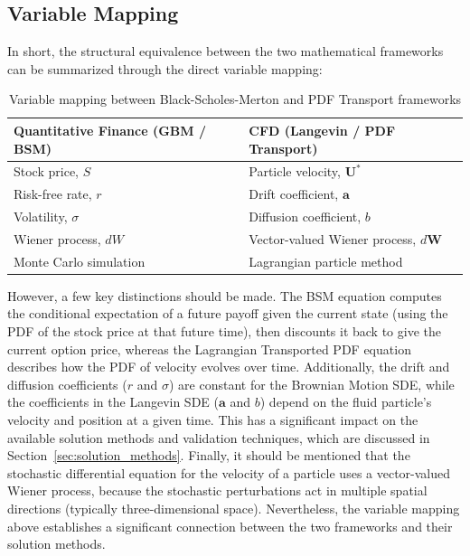 \documentclass[12pt, onecolumn, journal]{IEEEtran}
\begin{document}
\subsection{Variable Mapping}
In short, the structural equivalence between the two mathematical frameworks can be summarized through the direct variable mapping:
\begin{table}[H]
    \centering
    \caption{Variable mapping between Black-Scholes-Merton and PDF Transport frameworks}  
    \begin{tabular}{ll}
        \toprule
        \textbf{Quantitative Finance (GBM / BSM)} & \textbf{CFD (Langevin / PDF Transport)} \\
        \midrule
        Stock price, $S$ & Particle velocity, $\mathbf{U^*}$ \\
        Risk-free rate, $r$ & Drift coefficient, $\mathbf{a}$ \\
        Volatility, $\sigma$ & Diffusion coefficient, $b$ \\
        Wiener process, $dW$ & Vector-valued Wiener process, $d\mathbf{W}$ \\
        Monte Carlo simulation & Lagrangian particle method \\
        \bottomrule
    \end{tabular}
    \label{tab:mapping}
\end{table}
However, a few key distinctions should be made. The BSM equation computes the conditional expectation of a future payoff given the current state (using the PDF of the stock price at that future time), then discounts it back to give the current option price, whereas the Lagrangian Transported PDF equation describes how the PDF of velocity evolves over time. Additionally, the drift and diffusion coefficients ($r$ and $\sigma$) are constant for the Brownian Motion SDE, while the coefficients in the Langevin SDE ($\mathbf{a}$ and $b$) depend on the fluid particle's velocity and position at a given time. This has a significant impact on the available solution methods and validation techniques, which are discussed in Section~\ref{sec:solution_methods}. Finally, it should be mentioned that the stochastic differential equation for the velocity of a particle uses a vector-valued Wiener process, because the stochastic perturbations act in multiple spatial directions (typically three-dimensional space). Nevertheless, the variable mapping above establishes a significant connection between the two frameworks and their solution methods.

\end{document}
